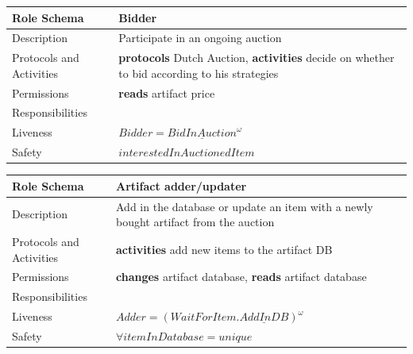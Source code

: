 \documentclass[a4paper, 11pt]{article}
\begin{document}
\begin{table}[H]
	\label{my-label}
	\begin{tabular}{l p{7cm}}
		\hline
		Role Schema              & Bidder \\
		\hline
		Description              & Participate in an ongoing auction \\
		Protocols and Activities & \textbf{protocols} Dutch Auction, \textbf{activities} decide on whether to bid according to his strategies \\
		Permissions              & \textbf{reads} artifact price \\
		\hline
		Responsibilities         &                   \\
		Liveness                 & \(Bidder=\underline{BidInAuction}^\omega \) \\
		Safety                   & \(interestedInAuctionedItem \) \\
		\hline
	\end{tabular}
\end{table}

\begin{table}[H]
	\label{my-label}
	\begin{tabular}{l p{7cm}}
		\hline
		Role Schema              & Artifact adder/updater \\
		\hline
		Description              & Add in the database or update an item with a newly bought artifact from the auction \\
		Protocols and Activities & \textbf{activities} add new items to the artifact DB \\
		Permissions              & \textbf{changes} artifact database, \textbf{reads} artifact database \\
		\hline
		Responsibilities         &                   \\
		Liveness                 & \(Adder=(WaitForItem.\underline{AddInDB})^\omega \) \\
		Safety                   & \(\forall itemInDatabase = unique \) \\
		\hline
	\end{tabular}
\end{table}
\end{document}

